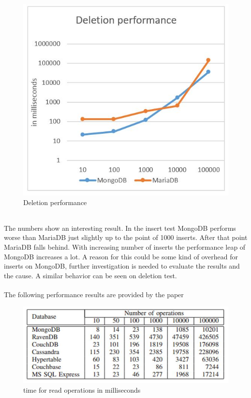 \begin{figure}[H]
\includegraphics[width=\linewidth,keepaspectratio]{images/Performance_Deletion.JPG}
\caption{Deletion performance}
\label{arch-example4}
\end{figure}
\\
The numbers show an interesting result. In the insert test MongoDB performs worse than MariaDB just slightly up to the point of 1000 inserts. After that point MariaDB falls behind. With increasing number of inserts the performance leap of MongoDB increases a lot. A reason for this could be some kind of overhead for inserts on MongoDB, further investigation is needed to evaluate the results and the cause. A similar behavior can be seen on deletion test.
\\\\
The following performance results are provided by the paper \cite{Li_A_2013}
\begin{figure}[H]
\includegraphics[width=\linewidth,keepaspectratio]{images/Performance_Reads.JPG}
\caption{time for read operations in milliseconds}
\label{arch-example2}
\end{figure}
